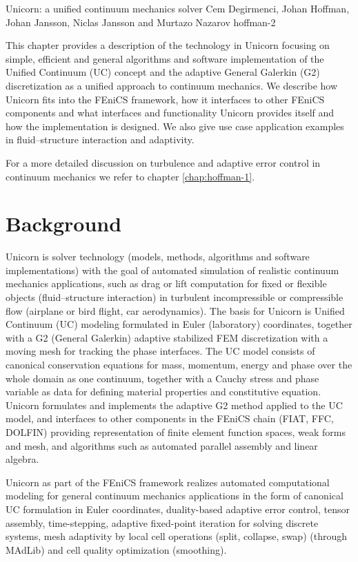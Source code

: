              {Unicorn: a unified continuum mechanics solver}
              {Cem Degirmenci, Johan Hoffman, Johan Jansson, Niclas Jansson and Murtazo Nazarov}
              {hoffman-2}

This chapter provides a description of the technology in Unicorn focusing
on simple, efficient and general algorithms and software implementation
of the Unified Continuum (UC) concept and the adaptive General Galerkin
(G2) discretization as a unified approach to continuum mechanics. We
describe how Unicorn fits into the FEniCS framework, how it interfaces
to other FEniCS components and what interfaces and functionality Unicorn
provides itself and how the implementation is designed. We also give use
case application examples in fluid--structure interaction and adaptivity.

For a more detailed discussion on turbulence and adaptive error control
in continuum mechanics we refer to chapter \ref{chap:hoffman-1}.


\section{Background}

Unicorn is solver technology (models, methods, algorithms and software
implementations) with the goal of automated simulation of realistic
continuum mechanics applications, such as drag or lift computation
for fixed or flexible objects (fluid--structure interaction) in
turbulent incompressible or compressible flow (airplane or bird flight,
car aerodynamics). The basis for Unicorn is Unified Continuum (UC)
modeling formulated in Euler (laboratory) coordinates, together with
a G2 (General Galerkin) adaptive stabilized FEM discretization with a
moving mesh for tracking the phase interfaces. The UC model consists of
canonical conservation equations for mass, momentum, energy and phase
over the whole domain as one continuum, together with a Cauchy stress and
phase variable as data for defining material properties and constitutive
equation. Unicorn formulates and implements the adaptive G2 method applied
to the UC model, and interfaces to other components in the FEniCS chain
(FIAT, FFC, DOLFIN) providing representation of finite element function
spaces, weak forms and mesh, and algorithms such as automated parallel
assembly and linear algebra.

Unicorn as part of the FEniCS framework realizes automated computational
modeling for general continuum mechanics applications in the form of
canonical UC formulation in Euler coordinates, duality-based adaptive
error control, tensor assembly, time-stepping, adaptive fixed-point
iteration for solving discrete systems, mesh adaptivity by local cell
operations (split, collapse, swap) (through MAdLib) and cell quality
optimization (smoothing).

